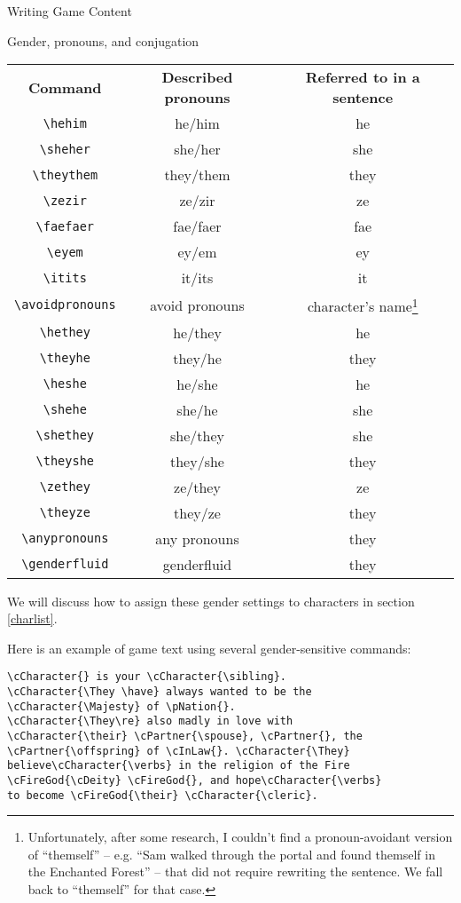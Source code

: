 \documentclass[11pt]{article}
\begin{document}
\begin{section}{Writing Game Content}
\begin{subsection}{Gender, pronouns, and conjugation}
\begin{tabular}{c|c|c}
\textbf{Command} & \textbf{Described pronouns} & \textbf{Referred to in a sentence} \\
\lstinline|\hehim| & he/him & he \\
\lstinline|\sheher| & she/her & she \\
\lstinline|\theythem| & they/them & they \\
\lstinline|\zezir| & ze/zir & ze \\
\lstinline|\faefaer| & fae/faer & fae \\
\lstinline|\eyem| & ey/em & ey \\
\lstinline|\itits| & it/its & it \\
\lstinline|\avoidpronouns| & avoid pronouns & character's name\footnote{Unfortunately, after some research, I couldn't find a pronoun-avoidant version of ``themself'' -- e.g. ``Sam walked through the portal and found themself in the Enchanted Forest'' -- that did not require rewriting the sentence.  We fall back to ``themself'' for that case.} \\
\lstinline|\hethey| & he/they & he \\
\lstinline|\theyhe| & they/he & they \\
\lstinline|\heshe| & he/she & he \\
\lstinline|\shehe| & she/he & she \\
\lstinline|\shethey| & she/they & she \\
\lstinline|\theyshe| & they/she & they \\
\lstinline|\zethey| & ze/they & ze \\
\lstinline|\theyze| & they/ze & they \\
\lstinline|\anypronouns| & any pronouns & they \\
\lstinline|\genderfluid| & genderfluid & they
\end{tabular}

We will discuss how to assign these gender settings to characters in section \ref{charlist}.

Here is an example of game text using several gender-sensitive commands:

\begin{verbatim}
\cCharacter{} is your \cCharacter{\sibling}.
\cCharacter{\They \have} always wanted to be the
\cCharacter{\Majesty} of \pNation{}.  
\cCharacter{\They\re} also madly in love with 
\cCharacter{\their} \cPartner{\spouse}, \cPartner{}, the 
\cPartner{\offspring} of \cInLaw{}. \cCharacter{\They} 
believe\cCharacter{\verbs} in the religion of the Fire
\cFireGod{\cDeity} \cFireGod{}, and hope\cCharacter{\verbs}
to become \cFireGod{\their} \cCharacter{\cleric}.
\end{verbatim} 


\end{subsection}
\end{section}
\end{document}
